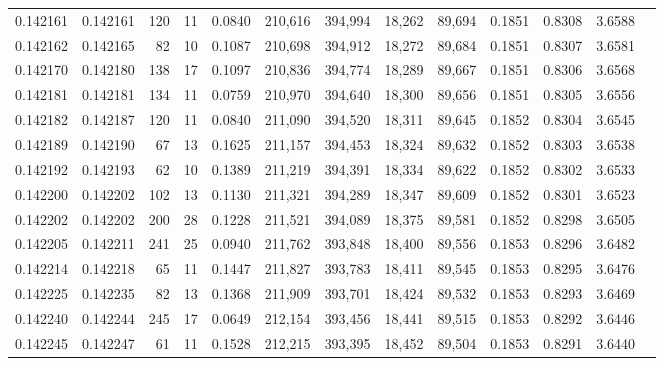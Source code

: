 \begin{tabular}{rrrrrrrrrrrrr}
0.142161 & 0.142161 &   120 &  11 &                                     0.0840 & 210,616 & 394,994 &  18,262 &  89,694 & 0.1851 & 0.8308 & 3.6588 \\
0.142162 & 0.142165 &    82 &  10 &                                     0.1087 & 210,698 & 394,912 &  18,272 &  89,684 & 0.1851 & 0.8307 & 3.6581 \\
0.142170 & 0.142180 &   138 &  17 &                                     0.1097 & 210,836 & 394,774 &  18,289 &  89,667 & 0.1851 & 0.8306 & 3.6568 \\
0.142181 & 0.142181 &   134 &  11 &                                     0.0759 & 210,970 & 394,640 &  18,300 &  89,656 & 0.1851 & 0.8305 & 3.6556 \\
0.142182 & 0.142187 &   120 &  11 &                                     0.0840 & 211,090 & 394,520 &  18,311 &  89,645 & 0.1852 & 0.8304 & 3.6545 \\
0.142189 & 0.142190 &    67 &  13 &                                     0.1625 & 211,157 & 394,453 &  18,324 &  89,632 & 0.1852 & 0.8303 & 3.6538 \\
0.142192 & 0.142193 &    62 &  10 &                                     0.1389 & 211,219 & 394,391 &  18,334 &  89,622 & 0.1852 & 0.8302 & 3.6533 \\
0.142200 & 0.142202 &   102 &  13 &                                     0.1130 & 211,321 & 394,289 &  18,347 &  89,609 & 0.1852 & 0.8301 & 3.6523 \\
0.142202 & 0.142202 &   200 &  28 &                                     0.1228 & 211,521 & 394,089 &  18,375 &  89,581 & 0.1852 & 0.8298 & 3.6505 \\
0.142205 & 0.142211 &   241 &  25 &                                     0.0940 & 211,762 & 393,848 &  18,400 &  89,556 & 0.1853 & 0.8296 & 3.6482 \\
0.142214 & 0.142218 &    65 &  11 &                                     0.1447 & 211,827 & 393,783 &  18,411 &  89,545 & 0.1853 & 0.8295 & 3.6476 \\
0.142225 & 0.142235 &    82 &  13 &                                     0.1368 & 211,909 & 393,701 &  18,424 &  89,532 & 0.1853 & 0.8293 & 3.6469 \\
0.142240 & 0.142244 &   245 &  17 &                                     0.0649 & 212,154 & 393,456 &  18,441 &  89,515 & 0.1853 & 0.8292 & 3.6446 \\
0.142245 & 0.142247 &    61 &  11 &                                     0.1528 & 212,215 & 393,395 &  18,452 &  89,504 & 0.1853 & 0.8291 & 3.6440 \\

\end{tabular}
